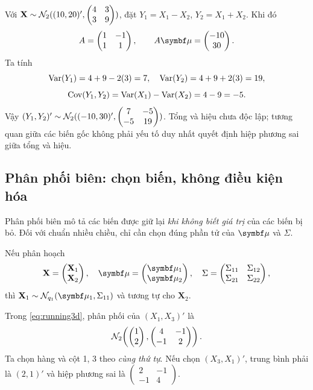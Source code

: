 \begin{example}
Với $\mathbf X\sim\mathcal N_2((10,20)',\begin{pmatrix}4&3\\3&9\end{pmatrix})$,
đặt $Y_1=X_1-X_2$, $Y_2=X_1+X_2$. Khi đó
\[
 A=\begin{pmatrix}1&-1\\1&1\end{pmatrix},\qquad
 A\vmu=\begin{pmatrix}-10\\30\end{pmatrix}.
\]
Ta tính
\[
 \operatorname{Var}(Y_1)=4+9-2(3)=7,\quad
 \operatorname{Var}(Y_2)=4+9+2(3)=19,
\]
\[
 \operatorname{Cov}(Y_1,Y_2)=\operatorname{Var}(X_1)-\operatorname{Var}(X_2)=4-9=-5.
\]
Vậy $(Y_1,Y_2)'\sim\mathcal N_2((-10,30)',\begin{pmatrix}7&-5\\-5&19\end{pmatrix})$.
Tổng và hiệu chưa độc lập; tương quan giữa các biến gốc không phải yếu tố
duy nhất quyết định hiệp phương sai giữa tổng và hiệu.
\end{example}

\subsection{Phân phối biên: chọn biến, không điều kiện hóa}
Phân phối biên mô tả các biến được giữ lại \emph{khi không biết giá trị}
của các biến bị bỏ. Đối với chuẩn nhiều chiều, chỉ cần chọn đúng phần tử
của $\vmu$ và $\Sigma$.

\begin{result}
Nếu phân hoạch
\[
 \mathbf X=\begin{pmatrix}\mathbf X_1\\\mathbf X_2\end{pmatrix},\quad
 \vmu=\begin{pmatrix}\vmu_1\\\vmu_2\end{pmatrix},\quad
 \Sigma=\begin{pmatrix}\Sigma_{11}&\Sigma_{12}\\\Sigma_{21}&\Sigma_{22}\end{pmatrix},
\]
thì $\mathbf X_1\sim\N_{q_1}(\vmu_1,\Sigma_{11})$ và tương tự cho
$\mathbf X_2$.
\end{result}

\begin{example}
Trong \eqref{eq:running3d}, phân phối của $(X_1,X_3)'$ là
\[
 \mathcal N_2\!\left(\begin{pmatrix}1\\2\end{pmatrix},
 \begin{pmatrix}4&-1\\-1&2\end{pmatrix}\right).
\]
Ta chọn hàng và cột 1, 3 theo \emph{cùng thứ tự}. Nếu chọn $(X_3,X_1)'$,
trung bình phải là $(2,1)'$ và hiệp phương sai là
$\begin{pmatrix}2&-1\\-1&4\end{pmatrix}$.
\end{example}


